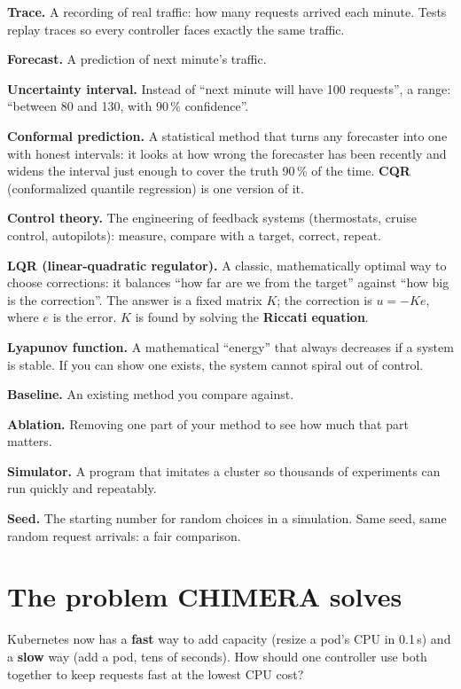 \documentclass[11pt,a4paper]{article}
\begin{document}
\textbf{Trace.} A recording of real traffic: how many requests arrived each minute. Tests
replay traces so every controller faces exactly the same traffic.

\textbf{Forecast.} A prediction of next minute's traffic.

\textbf{Uncertainty interval.} Instead of ``next minute will have 100 requests'', a range:
``between 80 and 130, with 90\,\% confidence''.

\textbf{Conformal prediction.} A statistical method that turns any forecaster into one
with honest intervals: it looks at how wrong the forecaster has been recently and widens
the interval just enough to cover the truth 90\,\% of the time. \textbf{CQR}
(conformalized quantile regression) is one version of it.

\textbf{Control theory.} The engineering of feedback systems (thermostats, cruise
control, autopilots): measure, compare with a target, correct, repeat.

\textbf{LQR (linear-quadratic regulator).} A classic, mathematically optimal way to choose
corrections: it balances ``how far are we from the target'' against ``how big is the
correction''. The answer is a fixed matrix $K$; the correction is $u = -K e$, where $e$
is the error. $K$ is found by solving the \textbf{Riccati equation}.

\textbf{Lyapunov function.} A mathematical ``energy'' that always decreases if a system is
stable. If you can show one exists, the system cannot spiral out of control.

\textbf{Baseline.} An existing method you compare against.

\textbf{Ablation.} Removing one part of your method to see how much that part matters.

\textbf{Simulator.} A program that imitates a cluster so thousands of experiments can run
quickly and repeatably.

\textbf{Seed.} The starting number for random choices in a simulation. Same seed, same
random request arrivals: a fair comparison.

\section{The problem CHIMERA solves}

\begin{idea}
Kubernetes now has a \textbf{fast} way to add capacity (resize a pod's CPU in 0.1\,s) and
a \textbf{slow} way (add a pod, tens of seconds). How should one controller use both
together to keep requests fast at the lowest CPU cost?
\end{idea}
\end{document}
